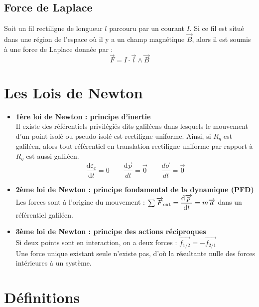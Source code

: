 \documentclass[a4paper,12pt]{article}
\newcommand{\re}{\textrm}
\newcommand{\diff}{\mathrm{d}} %
\renewcommand{\vec}{\overrightarrow}  %
\begin{document}
        \subsection{Force de Laplace}
        Soit un fil rectiligne de longueur $l$ parcouru par un 
        courant $I$. Si ce fil est situé dans une région de 
        l'espace où il y a un champ magnétique $\vec{B}$, alors il 
        est soumis à une force de Laplace donnée par :
        $$ \vec{F} = I \cdot \vec{l} \wedge \vec{B} $$

    \section{Les Lois de Newton}

        \begin{itemize}[label=$\bullet$]
            \item \textbf{1ère loi de Newton : principe d'inertie}\\
            Il existe des référentiels privilégiés dits galiléens dans lesquels le
            mouvement d'un point isolé ou pseudo-isolé est rectiligne uniforme.
            Ainsi, si $R_g$ est galiléen, alors tout référentiel en translation
            rectiligne uniforme par rapport à $R_g$ est aussi galiléen.
                $$ \frac{\diff \varepsilon_c}{\diff t} = 0 \quad\quad \frac{\diff \vec{p}}{d t} = \vec{0} \quad\quad \dfrac{d \vec{\sigma}}{d t} = \vec{0} $$

            \item \textbf{2ème loi de Newton : principe fondamental de la dynamique (PFD)} \\
            Les forces sont à l'origine du mouvement : $\sum \vec F_\re{ext} = \dfrac{\re d \vec p}{\re d t} = m \vec a$ dans un référentiel galiléen.

            \item \textbf{3ème loi de Newton : principe des actions réciproques} \\
            Si deux points sont en interaction, on a deux forces : $\vec{f_\re{1/2}} = - \vec{f_\re{2/1}}$\\
            Une force unique existant seule n'existe pas, d'où la résultante nulle des forces intérieures à un système.
        \end{itemize}


    \section{Définitions}
\end{document}
